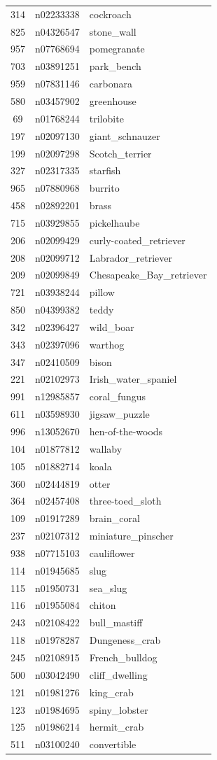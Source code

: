 \begin{table}
\begin{tabular}{cll}
314 & n02233338 & cockroach \\
825 & n04326547 & stone_wall \\
957 & n07768694 & pomegranate \\
703 & n03891251 & park_bench \\
959 & n07831146 & carbonara \\
580 & n03457902 & greenhouse \\
69 & n01768244 & trilobite \\
197 & n02097130 & giant_schnauzer \\
199 & n02097298 & Scotch_terrier \\
327 & n02317335 & starfish \\
965 & n07880968 & burrito \\
458 & n02892201 & brass \\
715 & n03929855 & pickelhaube \\
206 & n02099429 & curly-coated_retriever \\
208 & n02099712 & Labrador_retriever \\
209 & n02099849 & Chesapeake_Bay_retriever \\
721 & n03938244 & pillow \\
850 & n04399382 & teddy \\
342 & n02396427 & wild_boar \\
343 & n02397096 & warthog \\
347 & n02410509 & bison \\
221 & n02102973 & Irish_water_spaniel \\
991 & n12985857 & coral_fungus \\
611 & n03598930 & jigsaw_puzzle \\
996 & n13052670 & hen-of-the-woods \\
104 & n01877812 & wallaby \\
105 & n01882714 & koala \\
360 & n02444819 & otter \\
364 & n02457408 & three-toed_sloth \\
109 & n01917289 & brain_coral \\
237 & n02107312 & miniature_pinscher \\
938 & n07715103 & cauliflower \\
114 & n01945685 & slug \\
115 & n01950731 & sea_slug \\
116 & n01955084 & chiton \\
243 & n02108422 & bull_mastiff \\
118 & n01978287 & Dungeness_crab \\
245 & n02108915 & French_bulldog \\
500 & n03042490 & cliff_dwelling \\
121 & n01981276 & king_crab \\
123 & n01984695 & spiny_lobster \\
125 & n01986214 & hermit_crab \\
511 & n03100240 & convertible \\
\bottomrule
\end{tabular}
\end{table}
